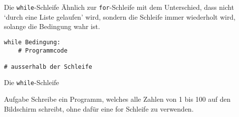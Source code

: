 \begin{frame}[fragile]{Die \texttt{while}-Schleife}
Ähnlich zur \texttt{for}-Schleife mit dem Unterschied, dass nicht `durch eine Liste gelaufen' wird, 
sondern die Schleife immer wiederholt wird, solange die Bedingung wahr ist.

    \begin{lstlisting}
while Bedingung:
    # Programmcode

# ausserhalb der Schleife
    \end{lstlisting}
\end{frame}

\begin{frame}{Die \texttt{while}-Schleife}
\begin{block}{Aufgabe}
Schreibe ein Programm, welches alle Zahlen von 1 bis 100 auf den Bildschirm schreibt, ohne dafür eine 
for Schleife zu verwenden.
\end{block}
\end{frame}


%

%

